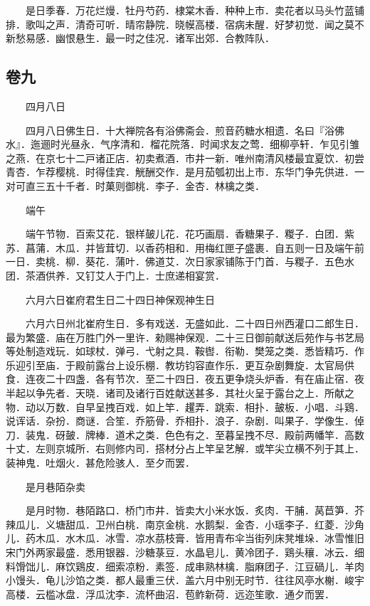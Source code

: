 　　是日季春．万花烂熳．牡丹芍药．棣棠木香．种种上市．卖花者以马头竹蓝铺排．歌叫之声．清奇可听．晴帘静院．晓幙高楼．宿病未醒．好梦初觉．闻之莫不新愁易感．幽恨悬生．最一时之佳况．诸军出郊．合教阵队．

\hypertarget{ux5377ux4e5d}{%
\subsection{卷九}\label{ux5377ux4e5d}}

　　四月八日

　　四月八日佛生日．十大禅院各有浴佛斋会．煎音药糖水相遗．名曰『浴佛水』．迤逦时光昼永．气序清和．榴花院落．时闻求友之莺．细柳亭轩．乍见引雏之燕．在京七十二戸诸正店．初卖煮酒．市井一新．唯州南清风楼最宜夏饮．初尝青杏．乍荐樱桃．时得佳宾．觥酬交作．是月茄瓠初出上市．东华门争先供进．一对可直三五十千者．时菓则御桃．李子．金杏．林檎之类．

　　端午

　　端午节物．百索艾花．银样皷儿花．花巧画扇．香糖果子．糉子．白团．紫苏．菖蒲．木瓜．并皆茸切．以香药相和．用梅红匣子盛裹．自五则一日及端午前一日．卖桃．柳．葵花．蒲叶．佛道艾．次日家家铺陈于门首．与糉子．五色水团．茶酒供养．又钉艾人于门上．士庶递相宴赏．

　　六月六日崔府君生日二十四日神保观神生日

　　六月六日州北崔府生日．多有戏送．无盛如此．二十四日州西灌口二郎生日．最为繁盛．庙在万胜门外一里许．勑赐神保观．二十三日御前献送后苑作与书艺局等处制造戏玩．如球杖．弹弓．弋射之具．鞍辔．衔勒．樊笼之类．悉皆精巧．作乐迎引至庙．于殿前露台上设乐棚．教坊钧容直作乐．更互杂剧舞旋．太官局供食．连夜二十四盏．各有节次．至二十四日．夜五更争烧头炉香．有在庙止宿．夜半起以争先者．天晓．诸司及诸行百姓献送甚多．其社火呈于露台之上．所献之物．动以万数．自早呈拽百戏．如上竿．趯弄．跳索．相扑．皷板．小唱．斗鶏．说诨话．杂扮．商谜．合笙．乔筋骨．乔相扑．浪子．杂剧．叫果子．学像生．倬刀．装鬼．砑皷．牌棒．道术之类．色色有之．至暮呈拽不尽．殿前两幡竿．高数十丈．左则京城所．右则修内司．搭材分占上竿呈艺解．或竿尖立横不列于其上．装神鬼．吐烟火．甚危险骇人．至夕而罢．

　　是月巷陌杂卖

　　是月时物．巷陌路口．桥门市井．皆卖大小米水饭．炙肉．干脯．莴苣笋．芥辣瓜儿．义塘甜瓜．卫州白桃．南京金桃．水鹅梨．金杏．小瑶李子．红菱．沙角儿．药木瓜．水木瓜．冰雪．凉水茘枝膏．皆用青布伞当街列床凳堆垛．冰雪惟旧宋门外两家最盛．悉用银器．沙糖菉豆．水晶皂儿．黄冷团子．鶏头穰．冰云．细料馉饳儿．麻饮鶏皮．细索凉粉．素签．成串熟林檎．脂麻团子．江豆碢儿．羊肉小馒头．龟儿沙馅之类．都人最重三伏．盖六月中别无时节．往往风亭水榭．峻宇高楼．云槛冰盘．浮瓜沈李．流杯曲沼．苞鲊新荷．远迩笙歌．通夕而罢．

